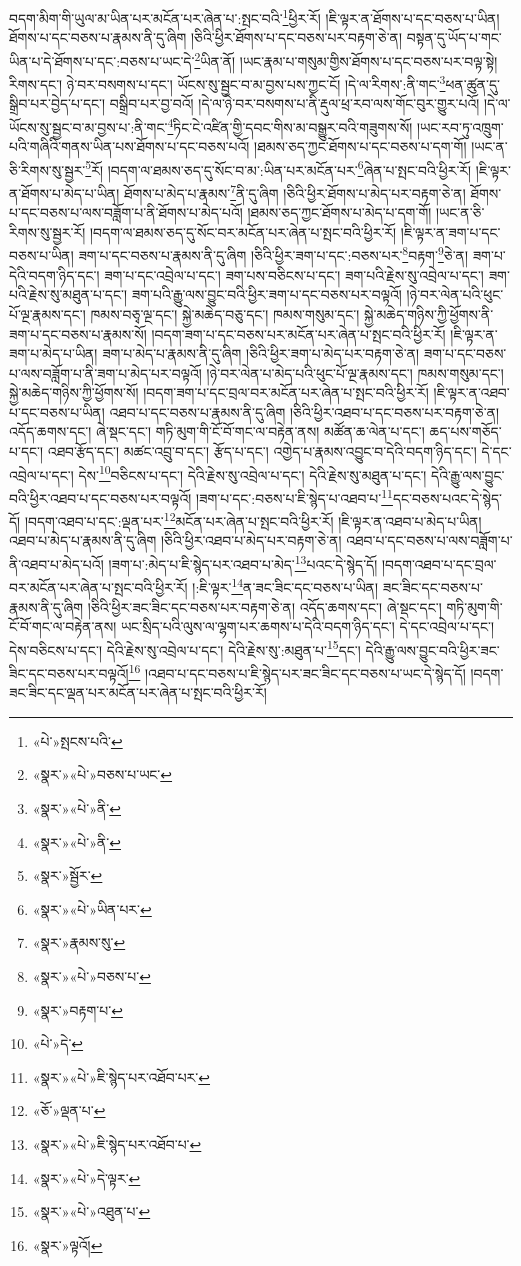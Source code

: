 བདག་མིག་གི་ཡུལ་མ་ཡིན་པར་མངོན་པར་ཞེན་པ་:སྤང་བའི་\footnote{«པེ་»སྤངས་པའི་}ཕྱིར་རོ། །ཇི་ལྟར་ན་ཐོགས་པ་དང་བཅས་པ་ཡིན། ཐོགས་པ་དང་བཅས་པ་རྣམས་ནི་དུ་ཞིག །ཅིའི་ཕྱིར་ཐོགས་པ་དང་བཅས་པར་བརྟག་ཅེ་ན། བསྟན་དུ་ཡོད་པ་གང་ཡིན་པ་དེ་ཐོགས་པ་དང་:བཅས་པ་ཡང་དེ་\footnote{«སྣར་»«པེ་»བཅས་པ་ཡང་}ཡིན་ནོ། །ཡང་རྣམ་པ་གསུམ་གྱིས་ཐོགས་པ་དང་བཅས་པར་བལྟ་སྟེ། རིགས་དང་། ཉེ་བར་བསགས་པ་དང་། ཡོངས་སུ་སྦྱང་བ་མ་བྱས་པས་ཀྱང་ངོ། །དེ་ལ་རིགས་:ནི་གང་\footnote{«སྣར་»«པེ་»ནི་}ཕན་ཚུན་དུ་སྒྲིབ་པར་བྱེད་པ་དང་། བསྒྲིབ་པར་བྱ་བའོ། །དེ་ལ་ཉེ་བར་བསགས་པ་ནི་རྡུལ་ཕྲ་རབ་ལས་གོང་བུར་གྱུར་པའོ། །དེ་ལ་ཡོངས་སུ་སྦྱང་བ་མ་བྱས་པ་:ནི་གང་\footnote{«སྣར་»«པེ་»ནི་}ཏིང་ངེ་འཛིན་གྱི་དབང་གིས་མ་བསྒྱུར་བའི་གཟུགས་སོ། །ཡང་རབ་ཏུ་འཁྲུག་པའི་གཞིའི་གནས་ཡིན་པས་ཐོགས་པ་དང་བཅས་པའོ། །ཐམས་ཅད་ཀྱང་ཐོགས་པ་དང་བཅས་པ་དག་གོ། །ཡང་ན་ཅི་རིགས་སུ་སྦྱར་\footnote{«སྣར་»སྦྱོར་}རོ། །བདག་ལ་ཐམས་ཅད་དུ་སོང་བ་མ་:ཡིན་པར་མངོན་པར་\footnote{«སྣར་»«པེ་»ཡིན་པར་}ཞེན་པ་སྤང་བའི་ཕྱིར་རོ། །ཇི་ལྟར་ན་ཐོགས་པ་མེད་པ་ཡིན། ཐོགས་པ་མེད་པ་རྣམས་\footnote{«སྣར་»རྣམས་སུ་}ནི་དུ་ཞིག །ཅིའི་ཕྱིར་ཐོགས་པ་མེད་པར་བརྟག་ཅེ་ན། ཐོགས་པ་དང་བཅས་པ་ལས་བཟློག་པ་ནི་ཐོགས་པ་མེད་པའོ། །ཐམས་ཅད་ཀྱང་ཐོགས་པ་མེད་པ་དག་གོ། །ཡང་ན་ཅི་རིགས་སུ་སྦྱར་རོ། །བདག་ལ་ཐམས་ཅད་དུ་སོང་བར་མངོན་པར་ཞེན་པ་སྤང་བའི་ཕྱིར་རོ། །ཇི་ལྟར་ན་ཟག་པ་དང་བཅས་པ་ཡིན། ཟག་པ་དང་བཅས་པ་རྣམས་ནི་དུ་ཞིག །ཅིའི་ཕྱིར་ཟག་པ་དང་:བཅས་པར་\footnote{«སྣར་»«པེ་»བཅས་པ་}བརྟག་\footnote{«སྣར་»བརྟག་པ་}ཅེ་ན། ཟག་པ་དེའི་བདག་ཉིད་དང་། ཟག་པ་དང་འབྲེལ་པ་དང་། ཟག་པས་བཅིངས་པ་དང་། ཟག་པའི་རྗེས་སུ་འབྲེལ་པ་དང་། ཟག་པའི་རྗེས་སུ་མཐུན་པ་དང་། ཟག་པའི་རྒྱུ་ལས་བྱུང་བའི་ཕྱིར་ཟག་པ་དང་བཅས་པར་བལྟའོ། །ཉེ་བར་ལེན་པའི་ཕུང་པོ་ལྔ་རྣམས་དང་། ཁམས་བཅྭ་ལྔ་དང་། སྐྱེ་མཆེད་བཅུ་དང་། ཁམས་གསུམ་དང་། སྐྱེ་མཆེད་གཉིས་ཀྱི་ཕྱོགས་ནི་ཟག་པ་དང་བཅས་པ་རྣམས་སོ། །བདག་ཟག་པ་དང་བཅས་པར་མངོན་པར་ཞེན་པ་སྤང་བའི་ཕྱིར་རོ། །ཇི་ལྟར་ན་ཟག་པ་མེད་པ་ཡིན། ཟག་པ་མེད་པ་རྣམས་ནི་དུ་ཞིག །ཅིའི་ཕྱིར་ཟག་པ་མེད་པར་བརྟག་ཅེ་ན། ཟག་པ་དང་བཅས་པ་ལས་བཟློག་པ་ནི་ཟག་པ་མེད་པར་བལྟའོ། །ཉེ་བར་ལེན་པ་མེད་པའི་ཕུང་པོ་ལྔ་རྣམས་དང་། ཁམས་གསུམ་དང་། སྐྱེ་མཆེད་གཉིས་ཀྱི་ཕྱོགས་སོ། །བདག་ཟག་པ་དང་བྲལ་བར་མངོན་པར་ཞེན་པ་སྤང་བའི་ཕྱིར་རོ། །ཇི་ལྟར་ན་འཐབ་པ་དང་བཅས་པ་ཡིན། འཐབ་པ་དང་བཅས་པ་རྣམས་ནི་དུ་ཞིག །ཅིའི་ཕྱིར་འཐབ་པ་དང་བཅས་པར་བརྟག་ཅེ་ན། འདོད་ཆགས་དང་། ཞེ་སྡང་དང་། གཏི་མུག་གི་ངོ་བོ་གང་ལ་བརྟེན་ནས། མཚོན་ཆ་ལེན་པ་དང་། ཆད་པས་གཅོད་པ་དང་། འཐབ་རྩོད་དང་། མཚང་འབྲུ་བ་དང་། རྩོད་པ་དང་། འགྱེད་པ་རྣམས་འབྱུང་བ་དེའི་བདག་ཉིད་དང་། དེ་དང་འབྲེལ་པ་དང་། དེས་\footnote{«པེ་»དེ་}བཅིངས་པ་དང་། དེའི་རྗེས་སུ་འབྲེལ་པ་དང་། དེའི་རྗེས་སུ་མཐུན་པ་དང་། དེའི་རྒྱུ་ལས་བྱུང་བའི་ཕྱིར་འཐབ་པ་དང་བཅས་པར་བལྟའོ། །ཟག་པ་དང་:བཅས་པ་ཇི་སྙེད་པ་འཐབ་པ་\footnote{«སྣར་»«པེ་»ཇི་སྙེད་པར་འཐོབ་པར་}དང་བཅས་པའང་དེ་སྙེད་དོ། །བདག་འཐབ་པ་དང་:ལྡན་པར་\footnote{«ཅོ་»ལྡན་པ་}མངོན་པར་ཞེན་པ་སྤང་བའི་ཕྱིར་རོ། །ཇི་ལྟར་ན་འཐབ་པ་མེད་པ་ཡིན། འཐབ་པ་མེད་པ་རྣམས་ནི་དུ་ཞིག །ཅིའི་ཕྱིར་འཐབ་པ་མེད་པར་བརྟག་ཅེ་ན། འཐབ་པ་དང་བཅས་པ་ལས་བཟློག་པ་ནི་འཐབ་པ་མེད་པའོ། །ཟག་པ་:མེད་པ་ཇི་སྙེད་པར་འཐབ་པ་མེད་\footnote{«སྣར་»«པེ་»ཇི་སྙེད་པར་འཐོབ་པ་}པའང་དེ་སྙེད་དོ། །བདག་འཐབ་པ་དང་བྲལ་བར་མངོན་པར་ཞེན་པ་སྤང་བའི་ཕྱིར་རོ། །:ཇི་ལྟར་\footnote{«སྣར་»«པེ་»དེ་ལྟར་}ན་ཟང་ཟིང་དང་བཅས་པ་ཡིན། ཟང་ཟིང་དང་བཅས་པ་རྣམས་ནི་དུ་ཞིག །ཅིའི་ཕྱིར་ཟང་ཟིང་དང་བཅས་པར་བརྟག་ཅེ་ན། འདོད་ཆགས་དང་། ཞེ་སྡང་དང་། གཏི་མུག་གི་ངོ་བོ་གང་ལ་བརྟེན་ནས། ཡང་སྲིད་པའི་ལུས་ལ་ལྷག་པར་ཆགས་པ་དེའི་བདག་ཉིད་དང་། དེ་དང་འབྲེལ་པ་དང་། དེས་བཅིངས་པ་དང་། དེའི་རྗེས་སུ་འབྲེལ་པ་དང་། དེའི་རྗེས་སུ་:མཐུན་པ་\footnote{«སྣར་»«པེ་»འཐུན་པ་}དང་། དེའི་རྒྱུ་ལས་བྱུང་བའི་ཕྱིར་ཟང་ཟིང་དང་བཅས་པར་བལྟའོ།\footnote{«སྣར་»ལྟའོ།} །འཐབ་པ་དང་བཅས་པ་ཇི་སྙེད་པར་ཟང་ཟིང་དང་བཅས་པ་ཡང་དེ་སྙེད་དོ། །བདག་ཟང་ཟིང་དང་ལྡན་པར་མངོན་པར་ཞེན་པ་སྤང་བའི་ཕྱིར་རོ། 